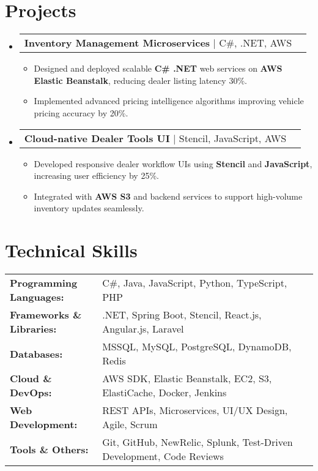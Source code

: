 \documentclass[letterpaper,11pt]{article}
\makeatletter
\newcommand{\resumeItem}[1]{
  \item\footnotesize{
    {#1 \vspace{-2pt}}
  }
}
\newcommand{\resumeProjectHeading}[2]{
    \item
    \begin{tabular*}{1.001\textwidth}{l@{\extracolsep{\fill}}r}
      \small#1 & \textbf{\small #2}\\
    \end{tabular*}\vspace{-7pt}
}
\newcommand{\resumeSubHeadingListStart}{\begin{itemize}[leftmargin=0pt, label={}]}
\newcommand{\resumeSubHeadingListEnd}{\end{itemize}}
\newcommand{\resumeItemListStart}{\begin{itemize}[leftmargin=*]}
\newcommand{\resumeItemListEnd}{\end{itemize}\vspace{-5pt}}
\makeatother
\begin{document}
\section{Projects}
    \vspace{-5pt}
    \resumeSubHeadingListStart
      \resumeProjectHeading
          {\textbf{Inventory Management Microservices} | C#, .NET, AWS}
          {}
          \resumeItemListStart
              \resumeItem{Designed and deployed scalable \textbf{C# .NET} web services on \textbf{AWS Elastic Beanstalk}, reducing dealer listing latency 30\%.}
              \resumeItem{Implemented advanced pricing intelligence algorithms improving vehicle pricing accuracy by 20\%.}
          \resumeItemListEnd
          \vspace{-16pt}
      \resumeProjectHeading
          {\textbf{Cloud-native Dealer Tools UI} | Stencil, JavaScript, AWS}
          {}
          \resumeItemListStart
              \resumeItem{Developed responsive dealer workflow UIs using \textbf{Stencil} and \textbf{JavaScript}, increasing user efficiency by 25\%.}
              \resumeItem{Integrated with \textbf{AWS S3} and backend services to support high-volume inventory updates seamlessly.}
          \resumeItemListEnd 
    \resumeSubHeadingListEnd
\vspace{-10pt}
\section{Technical Skills}
        \vspace{-14pt}
        \begin{table}[h]
            \footnotesize
            \begin{tabular}{p{0.3\linewidth} p{0.7\linewidth}}
                \textbf{Programming Languages:} & C\#, Java, JavaScript, Python, TypeScript, PHP \\
                \textbf{Frameworks \& Libraries:} & .NET, Spring Boot, Stencil, React.js, Angular.js, Laravel \\
                \textbf{Databases:} & MSSQL, MySQL, PostgreSQL, DynamoDB, Redis \\
                \textbf{Cloud \& DevOps:} & AWS SDK, Elastic Beanstalk, EC2, S3, ElastiCache, Docker, Jenkins \\
                \textbf{Web Development:} & REST APIs, Microservices, UI/UX Design, Agile, Scrum \\
                \textbf{Tools \& Others:} & Git, GitHub, NewRelic, Splunk, Test-Driven Development, Code Reviews \\
            \end{tabular}
        \end{table}
\end{document}
